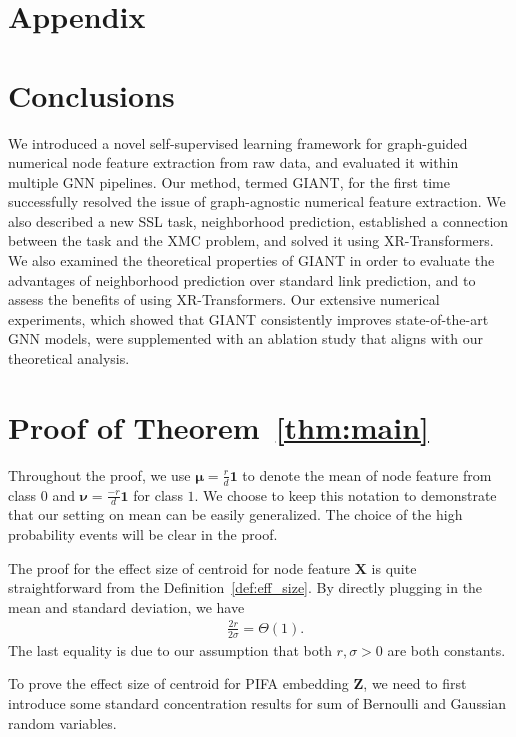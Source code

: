 \documentclass{article} \usepackage{iclr2022_conference,times}
\begin{document}




\clearpage
\appendix
\section*{Appendix}
\section{Conclusions}
We introduced a novel self-supervised learning framework for graph-guided numerical node feature extraction from raw data, and evaluated it within multiple GNN pipelines. Our method, termed GIANT, for the first time successfully resolved the issue of graph-agnostic numerical feature extraction. We also described a new SSL task, neighborhood prediction, established a connection between the task and the XMC problem, and solved it using XR-Transformers. We also examined the theoretical properties of GIANT in order to evaluate the advantages of neighborhood prediction over standard link prediction, and to assess the benefits of using XR-Transformers. Our extensive numerical experiments, which showed that GIANT consistently improves state-of-the-art GNN models, were supplemented with an ablation study that aligns with our theoretical analysis.

\section{Proof of Theorem~\ref{thm:main}}


Throughout the proof, we use $\boldsymbol{\mu} = \frac{r}{d}\mathbf{1}$ to denote the mean of node feature from class $0$ and $\boldsymbol{\nu} = \frac{-r}{d}\mathbf{1}$ for class $1$. We choose to keep this notation to demonstrate that our setting on mean can be easily generalized. The choice of the high probability events will be clear in the proof.

The proof for the effect size of centroid for node feature $\mathbf{X}$ is quite straightforward from the Definition~\ref{def:eff_size}. By directly plugging in the mean and standard deviation, we have
\begin{align}
	& \frac{2r}{2\sigma} = \Theta(1).
\end{align}
The last equality is due to our assumption that both $r,\sigma>0$ are both constants.

To prove the effect size of centroid for PIFA embedding $\mathbf{Z}$, we need to first introduce some standard concentration results for sum of Bernoulli and Gaussian random variables.
\end{document}
